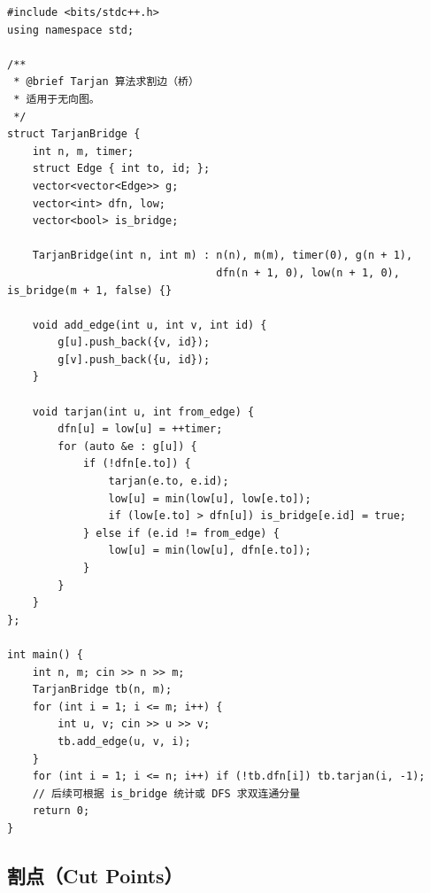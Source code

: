 \begin{lstlisting}
#include <bits/stdc++.h>
using namespace std;

/**
 * @brief Tarjan 算法求割边（桥）
 * 适用于无向图。
 */
struct TarjanBridge {
    int n, m, timer;
    struct Edge { int to, id; };
    vector<vector<Edge>> g;
    vector<int> dfn, low;
    vector<bool> is_bridge;

    TarjanBridge(int n, int m) : n(n), m(m), timer(0), g(n + 1), 
                                 dfn(n + 1, 0), low(n + 1, 0), is_bridge(m + 1, false) {}

    void add_edge(int u, int v, int id) {
        g[u].push_back({v, id});
        g[v].push_back({u, id});
    }

    void tarjan(int u, int from_edge) {
        dfn[u] = low[u] = ++timer;
        for (auto &e : g[u]) {
            if (!dfn[e.to]) {
                tarjan(e.to, e.id);
                low[u] = min(low[u], low[e.to]);
                if (low[e.to] > dfn[u]) is_bridge[e.id] = true;
            } else if (e.id != from_edge) {
                low[u] = min(low[u], dfn[e.to]);
            }
        }
    }
};

int main() {
    int n, m; cin >> n >> m;
    TarjanBridge tb(n, m);
    for (int i = 1; i <= m; i++) {
        int u, v; cin >> u >> v;
        tb.add_edge(u, v, i);
    }
    for (int i = 1; i <= n; i++) if (!tb.dfn[i]) tb.tarjan(i, -1);
    // 后续可根据 is_bridge 统计或 DFS 求双连通分量
    return 0;
}
\end{lstlisting}

\subsection{割点（Cut Points）}

